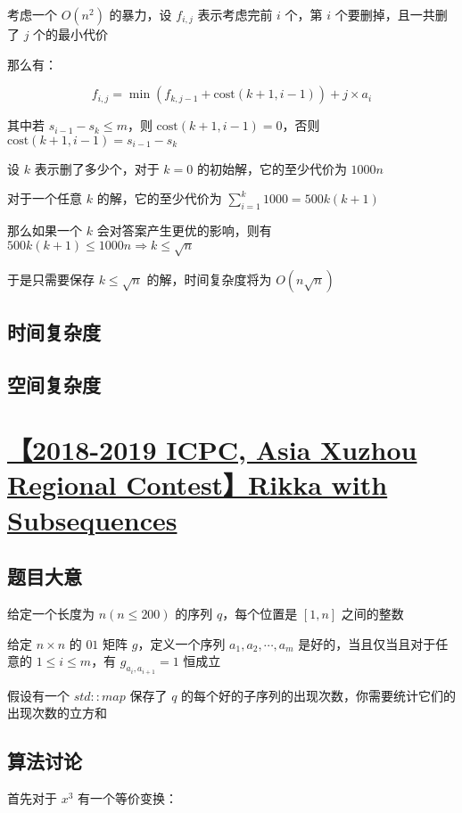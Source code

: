 \documentclass[UTF8]{article}
\begin{document}
考虑一个 $O(n^2)$ 的暴力，设 $f_{i,j}$ 表示考虑完前 $i$ 个，第 $i$ 个要删掉，且一共删了 $j$ 个的最小代价

那么有：

$$
f_{i,j}=\min(f_{k,j-1}+\text{cost}(k+1,i-1))+j \times a_i
$$

其中若 $s_{i-1}-s_{k} \le m$，则 $\text{cost}(k+1,i-1)=0$，否则 $\text{cost}(k+1,i-1)=s_{i-1}-s_{k}$

设 $k$ 表示删了多少个，对于 $k=0$ 的初始解，它的至少代价为 $1000n$

对于一个任意 $k$ 的解，它的至少代价为 $\sum_{i=1}^{k}1000=500k(k+1)$

那么如果一个 $k$ 会对答案产生更优的影响，则有 $500k(k+1) \le 1000n \Rightarrow k \le \sqrt n$

于是只需要保存 $k \le \sqrt n$ 的解，时间复杂度将为 $O(n \sqrt n)$

\subsection{时间复杂度}

\subsection{空间复杂度}

\section{\href{https://nanti.jisuanke.com/t/34061}{【2018-2019 ICPC, Asia Xuzhou Regional Contest】Rikka with Subsequences}}

\subsection{题目大意}

给定一个长度为 $n(n \le 200)$ 的序列 $q$，每个位置是 $[1, n]$ 之间的整数

给定 $n \times n$ 的 $01$ 矩阵 $g$，定义一个序列 $a_1,a_2, \cdots, a_m$ 是好的，当且仅当且对于任意的 $1 \le i \le m$，有 $g_{a_i,a_{i+1}}=1$ 恒成立

假设有一个 $std::map$ 保存了 $q$ 的每个好的子序列的出现次数，你需要统计它们的出现次数的立方和

\subsection{算法讨论}

首先对于 $x^3$ 有一个等价变换：
\end{document}
